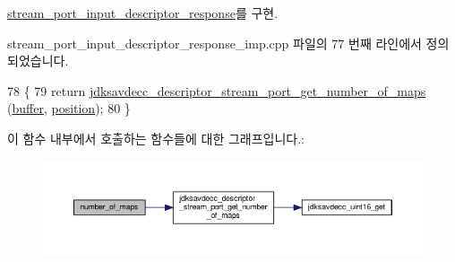 \hyperlink{classavdecc__lib_1_1stream__port__input__descriptor__response_acda32e14eb207ebd11856fab5172173c}{stream\+\_\+port\+\_\+input\+\_\+descriptor\+\_\+response}를 구현.



stream\+\_\+port\+\_\+input\+\_\+descriptor\+\_\+response\+\_\+imp.\+cpp 파일의 77 번째 라인에서 정의되었습니다.


\begin{DoxyCode}
78 \{
79     \textcolor{keywordflow}{return} \hyperlink{group__descriptor__stream__port_gaf9d286bd9ce8e7bcd8e0fc37d7a776ad}{jdksavdecc\_descriptor\_stream\_port\_get\_number\_of\_maps}
      (\hyperlink{classavdecc__lib_1_1descriptor__response__base__imp_a56ed84df35de10bdb65e72b184309497}{buffer}, \hyperlink{classavdecc__lib_1_1descriptor__response__base__imp_a7a04afe5347934be732ec70a70bd0a28}{position});
80 \}
\end{DoxyCode}


이 함수 내부에서 호출하는 함수들에 대한 그래프입니다.\+:
\nopagebreak
\begin{figure}[H]
\begin{center}
\leavevmode
\includegraphics[width=350pt]{classavdecc__lib_1_1stream__port__input__descriptor__response__imp_a05d30e1a63b1459efaacfc203df1c9d7_cgraph}
\end{center}
\end{figure}


